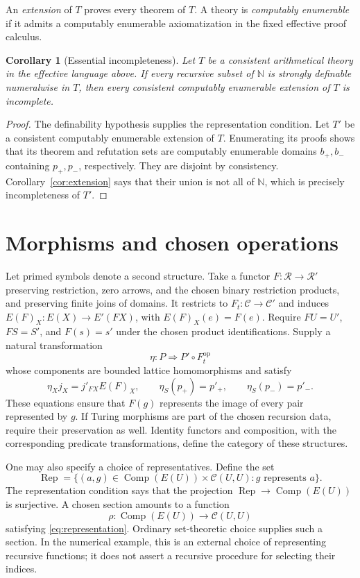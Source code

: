 \documentclass[11pt]{article}
\newtheorem{corollary}[theorem]{Corollary}
\theoremstyle{definition}
\newcommand{\R}{\mathcal R}
\newcommand{\C}{\mathcal C}
\newcommand{\Comp}{\operatorname{Comp}}
\begin{document}
An \emph{extension} of $T$ proves every theorem of $T$. A theory is
\emph{computably enumerable} if it admits a computably enumerable
axiomatization in the fixed effective proof calculus.

\begin{corollary}[Essential incompleteness]\label{cor:arithmetic}
Let $T$ be a consistent arithmetical theory in the effective language
above. If every recursive subset of $\mathbb N$ is strongly definable
numeralwise in $T$, then every consistent computably enumerable
extension of $T$ is incomplete.
\end{corollary}
\begin{proof}
The definability hypothesis supplies the representation condition.
Let $T'$ be a consistent computably enumerable extension of $T$.
Enumerating its proofs shows that its theorem and refutation sets are
computably enumerable domains
$b_+,b_-$ containing $p_+,p_-$, respectively. They are disjoint by
consistency. Corollary~\ref{cor:extension} says that their union is not
all of $\mathbb N$, which is precisely incompleteness of $T'$.
\end{proof}

\section{Morphisms and chosen operations}

Let primed symbols denote a second structure. Take a functor
$F:\R\to\R'$ preserving restriction, zero arrows, and the chosen
binary restriction products, and preserving finite joins of domains.
It restricts to $F_t:\C\to\C'$ and induces
$E(F)_X:E(X)\to E'(FX)$, with $E(F)_X(e)=F(e)$.
Require $FU=U'$, $FS=S'$, and $F(s)=s'$ under the chosen product
identifications. Supply a natural transformation
\[
 \eta:P\Longrightarrow P'\circ F_t^{\mathrm{op}}
\]
whose components are bounded lattice homomorphisms and satisfy
\[
 \eta_Xj_X=j'_{FX}E(F)_X,\qquad
 \eta_S(p_+)=p'_+,\qquad\eta_S(p_-)=p'_-.
\]
These equations ensure that $F(g)$ represents the image of every pair
represented by $g$. If Turing morphisms are part of the chosen recursion
data, require their preservation as well. Identity functors and
composition, with the corresponding predicate transformations, define
the category of these structures.

One may also specify a choice of representatives. Define the set
\[
 \operatorname{Rep}=
 \{(a,g)\in\Comp(E(U))\times\C(U,U):g\text{ represents }a\}.
\]
The representation condition says that the projection
$\operatorname{Rep}\to\Comp(E(U))$ is surjective. A chosen section
amounts to a function
\[
 \rho:\Comp(E(U))\longrightarrow\C(U,U)
\]
satisfying \eqref{eq:representation}. Ordinary set-theoretic choice
supplies such a section. In the numerical example, this is an external
choice of representing recursive functions; it does not assert a
recursive procedure for selecting their indices.
\end{document}
